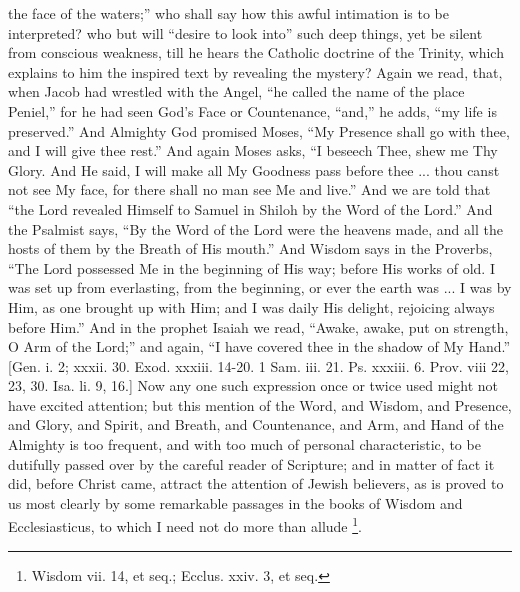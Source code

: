 the face of the waters;'' who shall say how this awful intimation
is to be interpreted? who but will ``desire to look into''
such deep things, yet be silent from conscious weakness, till he hears
the Catholic doctrine of the Trinity, which explains to him the
inspired text by revealing the mystery? Again we read, that, when
Jacob had wrestled with the Angel, ``he called the name of the
place Peniel,'' for he had seen God's Face or Countenance,
``and,'' he adds, ``my life is preserved.'' And
Almighty God promised Moses, ``My Presence shall go with thee, and
I will give thee rest.'' And again Moses asks, ``I beseech
Thee, shew me Thy Glory. And He said, I will make all My Goodness pass
before thee ... thou canst not see My face, for there shall no man see
Me and live.'' And we are told that ``the Lord revealed
Himself to Samuel in Shiloh by the Word of the Lord.'' And the
Psalmist says, ``By the Word of the Lord were the heavens made,
and all the hosts of them by the Breath of His mouth.'' And Wisdom
says in the Proverbs, ``The Lord possessed Me in the beginning of
His way; before His works of old. I was set up from everlasting, from
the beginning, or ever the earth was ... I was by Him, as one brought
up with Him; and I was daily His delight, rejoicing always before
Him.'' And in the prophet Isaiah we read, ``Awake, awake, put
on strength, O Arm of the Lord;'' and again, ``I have covered
thee in the shadow of My Hand.'' [Gen. i. 2; xxxii. 30. Exod.
xxxiii. 14-20. 1 Sam. iii. 21. Ps. xxxiii. 6. Prov. viii 22, 23, 30.
Isa. li. 9, 16.] Now any one such expression once or twice used might
not have excited attention; but this mention of the Word, and Wisdom,
and Presence, and Glory, and Spirit, and Breath, and Countenance, and
Arm, and Hand of the Almighty is too frequent, and with too much of
personal characteristic, to be dutifully passed over by the careful
reader of Scripture; and in matter of fact it did, before Christ came,
attract the attention of Jewish believers, as is proved to us most
clearly by some remarkable passages in the books of Wisdom and
Ecclesiasticus, to which I need not do more than allude \footnote{Wisdom vii. 14, et seq.; Ecclus. xxiv. 3, et
seq.}.

